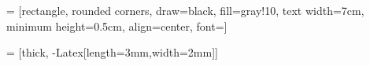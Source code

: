 
 = [rectangle, rounded corners,
                     draw=black, fill=gray!10,
                     text width=7cm, minimum height=0.5cm,
                     align=center, font=\small]

 = [thick, -{Latex[length=3mm,width=2mm]}]
\thispagestyle{empty}
\setcounter{page}{0}
\newpage
\text{}
\clearpage
\thispagestyle{fancyIndice}
\tableofcontents
\clearpage
\newpage
\thispagestyle{empty}
\setcounter{page}{0}
\text{}
\newpage
